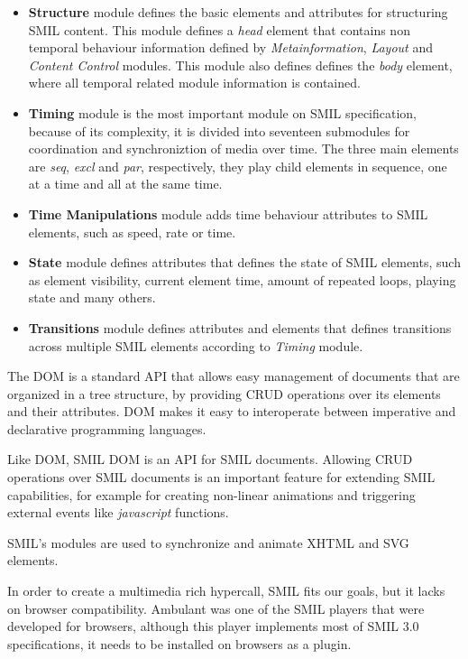 \begin{itemize}
  \item \textbf{Structure} module defines the basic elements and attributes for structuring \ac{SMIL} content. This module defines a \textit{head} element that contains non temporal behaviour information defined by  \textit{Metainformation}, \textit{Layout} and \textit{Content Control} modules. This module also defines defines the \textit{body} element, where all temporal related module information is contained.

  \item \textbf{Timing} module is the most important module on \ac{SMIL} specification, because of its complexity, it is divided into seventeen submodules for coordination and synchroniztion of media over time. The three main elements are \textit{seq}, \textit{excl} and \textit{par}, respectively, they play child elements in sequence, one at a time and all at the same time. 

  \item \textbf{Time Manipulations} module adds time behaviour attributes to \ac{SMIL} elements, such as speed, rate or time.

  \item \textbf{State} module defines attributes that defines the state of \ac{SMIL} elements, such as element visibility, current element time, amount of repeated loops, playing state and many others.

  \item \textbf{Transitions} module defines attributes and elements that defines transitions across multiple \ac{SMIL} elements according to \textit{Timing} module.

\end{itemize}

The \ac{DOM} is a standard \ac{API} that allows easy management of documents that are organized in a tree structure, by providing \ac{CRUD} operations over its elements and their attributes. \ac{DOM} makes it easy to interoperate between imperative and declarative programming languages.
  
Like \ac{DOM}, \ac{SMIL} \ac{DOM} is an \ac{API} for \ac{SMIL} documents. Allowing \ac{CRUD} operations over \ac{SMIL} documents is an important feature for extending \ac{SMIL} capabilities, for example for creating non-linear animations and triggering external events like \textit{javascript} functions.  

  \ac{SMIL}'s modules are used to synchronize and animate \ac{XHTML} and \ac{SVG} elements.

  In order to create a multimedia rich hypercall, \ac{SMIL} fits our goals, but it lacks on browser compatibility. Ambulant \cite{ambulant} was one of the SMIL players that were developed for browsers, although this player implements most of \ac{SMIL} 3.0 \cite{smil3} specifications, it needs to be installed on browsers as a plugin.

